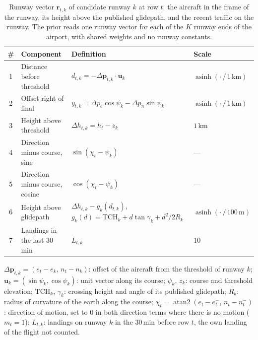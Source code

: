\begin{table}[t]
\centering
\caption{Runway vector $\mathbf{r}_{t,k}$ of candidate runway $k$ at row $t$: the aircraft in the frame of the
runway, its height above the published glidepath, and the recent traffic on the runway. The prior reads one runway
vector for each of the $K$ runway ends of the airport, with shared weights and no runway constants.}
\label{tab:runway-vector}
\small
\renewcommand{\arraystretch}{1.25}
\begin{tabularx}{\textwidth}{@{}c l >{\raggedright\arraybackslash}X l@{}}
\toprule
\# & Component & Definition & Scale \\
\midrule
1 & Distance before threshold      & $d_{t,k} = -\Delta\mathbf{p}_{t,k}\cdot\mathbf{u}_k$ & $\operatorname{asinh}(\cdot\,/\,1\,\mathrm{km})$ \\
2 & Offset right of final          & $y_{t,k} = \Delta p_e\cos\psi_k - \Delta p_n\sin\psi_k$ & $\operatorname{asinh}(\cdot\,/\,1\,\mathrm{km})$ \\
3 & Height above threshold         & $\Delta h_{t,k} = h_t - z_k$ & $1\,\mathrm{km}$ \\
4 & Direction minus course, sine   & $\sin(\chi_t - \psi_k)$ & --- \\
5 & Direction minus course, cosine & $\cos(\chi_t - \psi_k)$ & --- \\
6 & Height above glidepath         & $\Delta h_{t,k} - g_k(d_{t,k})$, \quad $g_k(d) = \mathrm{TCH}_k + d\tan\gamma_k + d^2/2R_k$ & $\operatorname{asinh}(\cdot\,/\,100\,\mathrm{m})$ \\
7 & Landings in the last 30\,min   & $L_{t,k}$ & $10$ \\
\bottomrule
\end{tabularx}
\par\smallskip
{\footnotesize $\Delta\mathbf{p}_{t,k} = (e_t - e_k,\, n_t - n_k)$: offset of the aircraft from the threshold of runway $k$;
$\mathbf{u}_k = (\sin\psi_k, \cos\psi_k)$: unit vector along its course; $\psi_k$, $z_k$: course and threshold
elevation; $\mathrm{TCH}_k$, $\gamma_k$: crossing height and angle of its published glidepath; $R_k$: radius of
curvature of the earth along the course; $\chi_t = \operatorname{atan2}(e_t - e_t^-,\, n_t - n_t^-)$: direction of
motion, set to $0$ in both direction terms where there is no motion ($m_t = 1$); $L_{t,k}$: landings on runway $k$ in
the 30\,min before row $t$, the own landing of the flight not counted.\par}
\end{table}
